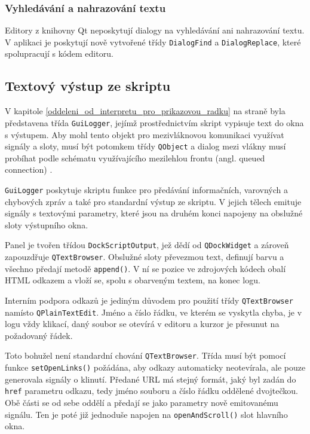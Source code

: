 \documentclass[11pt,twoside,a4paper]{book}
\begin{document}
\subsubsection{Vyhledávání a nahrazování textu}

Editory z knihovny Qt neposkytují dialogy na vyhledávání ani nahrazování textu. V aplikaci je poskytují nově vytvořené třídy \texttt{DialogFind} a \texttt{DialogReplace}, které spolupracují s kódem editoru.


\subsection{Textový výstup ze skriptu}

V kapitole \ref{oddeleni_od_interpretu_pro_prikazovou_radku} na straně \pageref{oddeleni_od_interpretu_pro_prikazovou_radku} byla představena třída \texttt{GuiLogger}, jejímž prostřednictvím skript vypisuje text do okna s výstupem. Aby mohl tento objekt pro mezivláknovou komunikaci využívat signály a sloty, musí být potomkem třídy \texttt{QObject} a dialog mezi vlákny musí probíhat podle schématu využívajícího mezilehlou frontu (angl. queued connection) \cite{qt_threads}.

\texttt{GuiLogger} poskytuje skriptu funkce pro předávání informačních, varovných a chybových zpráv a také pro standardní výstup ze skriptu. V jejich tělech emituje signály s textovými parametry, které jsou na druhém konci napojeny na obslužné sloty výstupního okna.

Panel je tvořen třídou \texttt{DockScriptOutput}, jež dědí od \texttt{QDockWidget} a zároveň zapouzdřuje \texttt{QTextBrowser}. Obslužné sloty převezmou text, definují barvu a všechno předají metodě \texttt{append()}. V ní se pozice ve zdrojových kódech obalí HTML odkazem a vloží se, spolu s obarveným textem, na konec logu.

Interním podpora odkazů je jediným důvodem pro použití třídy \texttt{QTextBrowser} namísto \texttt{QPlainTextEdit}. Jméno a číslo řádku, ve kterém se vyskytla chyba, je v logu vždy klikací, daný soubor se otevírá v editoru a kurzor je přesunut na požadovaný řádek.

Toto bohužel není standardní chování \texttt{QTextBrowser}. Třída musí být pomocí funkce \texttt{set\-Open\-Links()} požádána, aby odkazy automaticky neotevírala, ale pouze generovala signály o klinutí. Předané URL má stejný formát, jaký byl zadán do \texttt{href} parametru odkazu, tedy jméno souboru a číslo řádku oddělené dvojtečkou. Obě části se od sebe oddělí a předají se jako parametry nově emitovanému signálu. Ten je poté již jednoduše napojen na \texttt{openAndScroll()} slot hlavního okna.
\end{document}
